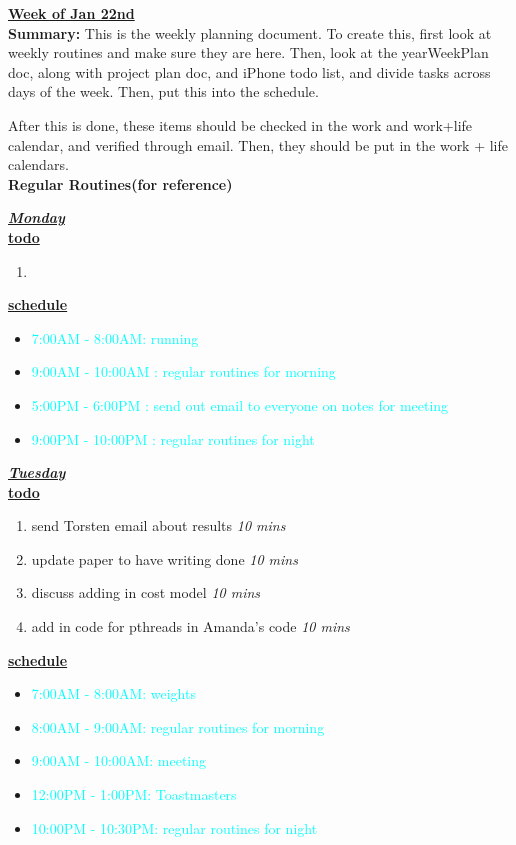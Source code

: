 \documentclass[8pt]{article}
\newcommand{\timeEst}[1]{\textit{#1}}
\newcommand{\regItem}[1]{\item \textcolor{cyan}{#1}}
\begin{document}
\huge{\underline{\textbf{Week of Jan 22nd}}}\\

\textbf{Summary:} This is the weekly planning document. To create
this, first look at weekly routines and make sure they are here. Then,
look at the yearWeekPlan doc, along with project plan doc, and iPhone
todo list, and divide tasks across days of the week. Then, put this
into the schedule.

After this is done, these items should be checked in the work and
work+life calendar, and verified through email.
Then, they should be put in the work + life
calendars. \\

\textbf{Regular Routines(for reference)}



\underline{\textbf{\textit{Monday}}}\\
\underline{\textbf{todo}}\\

\begin{enumerate}
\item
\end{enumerate}
\underline{\textbf{schedule}}\\
\begin{itemize}
\regItem{7:00AM - 8:00AM: running}
\regItem{9:00AM - 10:00AM : regular routines for morning}
\regItem{5:00PM - 6:00PM : send out email to everyone on notes for meeting}
\regItem{9:00PM - 10:00PM : regular routines for night}
\end{itemize}

\underline{\textbf{\textit{Tuesday}}}\\
\underline{\textbf{todo}}\\
\begin{enumerate}
\item send Torsten email about results \timeEst{10 mins}
\item update paper to have writing done \timeEst{10 mins}
\item discuss adding in cost model \timeEst{10 mins}
\item add in code for pthreads in Amanda's code \timeEst{10 mins}
\end{enumerate}

\underline{\textbf{schedule}}\\
\begin{itemize}
\regItem{7:00AM - 8:00AM: weights}
\regItem {8:00AM - 9:00AM: regular routines for morning}
\regItem {9:00AM - 10:00AM: meeting}
\regItem {12:00PM - 1:00PM: Toastmasters}
\regItem {10:00PM - 10:30PM: regular routines for night}
\end{itemize}
\end{document}
